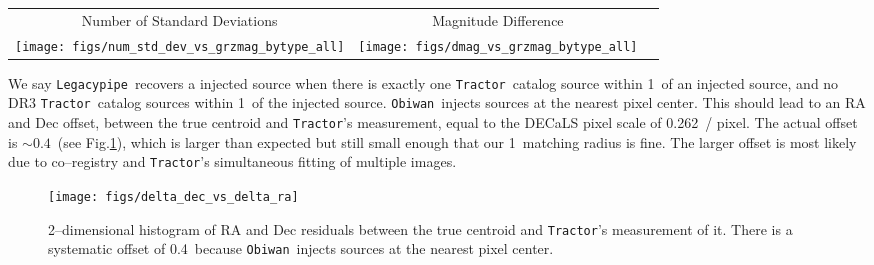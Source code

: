 \documentclass[a4paper,fleqn,usenatbib]{mnras}
\newcommand{\gb}{$g$}
\newcommand{\rband}{$r$}
\newcommand{\zb}{$z$}
\newcommand{\tractor}{{\tt Tractor}}
\newcommand{\legacypipe}{{\tt Legacypipe}}
\newcommand{\obiwan}{{\tt Obiwan}}
\begin{document}

\begin{figure*}
\begin{center}
\begin{tabular}{ccc}
      Number of Standard Deviations & Magnitude Difference \\
      \texttt{[image: figs/num\_std\_dev\_vs\_grzmag\_bytype\_all]} &
      \texttt{[image: figs/dmag\_vs\_grzmag\_bytype\_all]}
      \\
\end{tabular}
\caption{2--dimensional histograms of truth--\tractor\, residuals. (Left) $N_\sigma$ for \gb, \rband, \zb\, flux versus \gb, \rband, \zb\, magnitude, respectively. Yellow lines are the q25, 50, 75 percentiles. (Right) Magnitude residuals versus  \gb, \rband, \zb\, magnitude.}
\label{fig:num-std-dev-and-dmag}
\end{center}
\end{figure*}

We say \legacypipe\, recovers a injected source when there is exactly one \tractor\, catalog source within 1\arcsec\, of an injected source, and no DR3 \tractor\, catalog sources within 1\arcsec\, of the injected source. \obiwan\, injects sources at the nearest pixel center. This should lead to an RA and Dec offset, between the true centroid and \tractor's measurement, equal to the DECaLS pixel scale of 0.262\arcsec\, / pixel. The actual offset is $\sim 0.4$\arcsec\, (see Fig.\ref{fig:delta-radec}), which is larger than expected but still small enough that our 1\arcsec\, matching radius is fine. The larger offset is most likely due to co--registry and \tractor's simultaneous fitting of multiple images.

\begin{figure}
\begin{center}
 \texttt{[image: figs/delta\_dec\_vs\_delta\_ra]}
\end{center}
 \caption{2--dimensional histogram of RA and Dec residuals between the true centroid and \tractor's measurement of it. There is a systematic offset of 0.4\arcsec\, because \obiwan\, injects sources at the nearest pixel center.}
 \label{fig:delta-radec}
\end{figure}
\end{document}
